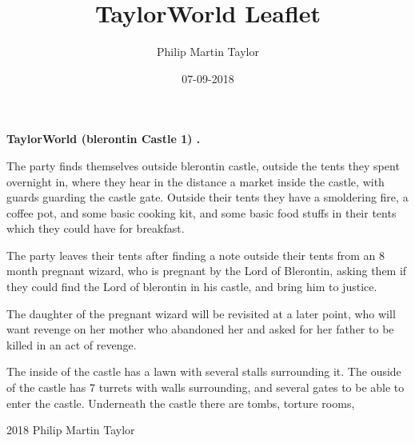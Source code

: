 \documentclass[12pt,a4paper]{book}
\date{07-09-2018}
\author{Philip Martin Taylor}
\title{TaylorWorld Leaflet}
\begin{document}
\begin{center}
\textbf{TaylorWorld (blerontin Castle 1) \texttrademark.}
\end{center}
\begin{flushleft}
  The party finds themselves outside blerontin castle, outside the tents they spent overnight in, where they hear in the distance a market inside the castle, with guards guarding the castle gate. Outside their tents they have a smoldering fire, a coffee pot, and some basic cooking kit, and some basic food stuffs in their tents which they could have for breakfast.
\end{flushleft}
\begin{flushleft}
  The party leaves their tents after finding a note outside their tents from an 8 month pregnant wizard, who is pregnant by the Lord of Blerontin, asking them if they could find the Lord of blerontin in his castle, and bring him to justice. 
\end{flushleft}
\begin{flushleft}
  The daughter of the pregnant wizard will be revisited at a later point, who will want revenge on her mother who abandoned her and asked for her father to be killed in an act of revenge.
\end{flushleft}
\begin{flushleft}
  The inside of the castle has a lawn with several stalls surrounding it. The ouside of the castle has 7 turrets with walls surrounding, and several gates to be able to enter the castle. Underneath the castle there are tombs, torture rooms, 
\end{flushleft}
\begin{center}
  \textcopyright{} 2018 Philip Martin Taylor
\end{center}
\end{document}
